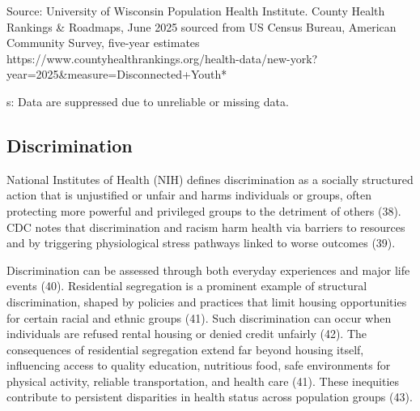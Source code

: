 \documentclass[
  english,
  letterpaper,
]{report}
\begin{document}
\begin{tcolorbox}[enhanced jigsaw, breakable, leftrule=.75mm, title=\textcolor{quarto-callout-note-color}{\faInfo}\hspace{0.5em}{Source}, bottomrule=.15mm, opacityback=0, left=2mm, colback=white, bottomtitle=1mm, coltitle=black, colbacktitle=quarto-callout-note-color!10!white, colframe=quarto-callout-note-color-frame, opacitybacktitle=0.6, toptitle=1mm, titlerule=0mm, arc=.35mm, rightrule=.15mm, toprule=.15mm]

Source: University of Wisconsin Population Health Institute. County
Health Rankings \& Roadmaps, June 2025 sourced from US Census Bureau,
American Community Survey, five-year estimates
https://www.countyhealthrankings.org/health-data/new-york?year=2025\&measure=Disconnected+Youth*

\end{tcolorbox}

\begin{tcolorbox}[enhanced jigsaw, breakable, leftrule=.75mm, title=\textcolor{quarto-callout-note-color}{\faInfo}\hspace{0.5em}{Note}, bottomrule=.15mm, opacityback=0, left=2mm, colback=white, bottomtitle=1mm, coltitle=black, colbacktitle=quarto-callout-note-color!10!white, colframe=quarto-callout-note-color-frame, opacitybacktitle=0.6, toptitle=1mm, titlerule=0mm, arc=.35mm, rightrule=.15mm, toprule=.15mm]

s: Data are suppressed due to unreliable or missing data.

\end{tcolorbox}

\subsection{Discrimination}\label{discrimination}

National Institutes of Health (NIH) defines discrimination as a socially
structured action that is unjustified or unfair and harms individuals or
groups, often protecting more powerful and privileged groups to the
detriment of others (38). CDC notes that discrimination and racism harm
health via barriers to resources and by triggering physiological stress
pathways linked to worse outcomes (39).

Discrimination can be assessed through both everyday experiences and
major life events (40). Residential segregation is a prominent example
of structural discrimination, shaped by policies and practices that
limit housing opportunities for certain racial and ethnic groups (41).
Such discrimination can occur when individuals are refused rental
housing or denied credit unfairly (42). The consequences of residential
segregation extend far beyond housing itself, influencing access to
quality education, nutritious food, safe environments for physical
activity, reliable transportation, and health care (41). These
inequities contribute to persistent disparities in health status across
population groups (43).
\end{document}
